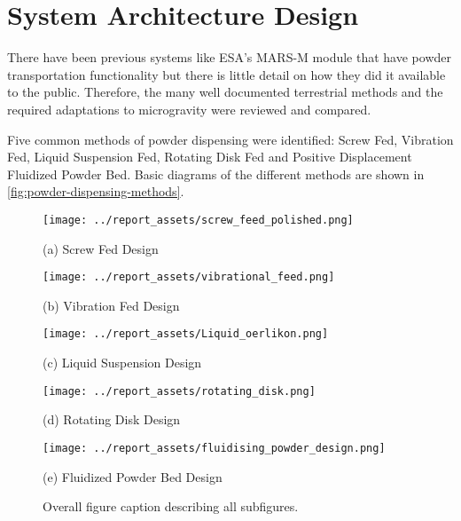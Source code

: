 \section{System Architecture Design}\label{sec:system_architecture}
There have been previous systems like ESA's MARS-M module that have powder transportation functionality but there is little detail on how they did it available to the public. Therefore, the many well documented terrestrial methods and the required adaptations to microgravity were reviewed and compared.

Five common methods of powder dispensing were identified: Screw Fed, Vibration Fed, Liquid Suspension Fed, Rotating Disk Fed and Positive Displacement Fluidized Powder Bed. Basic diagrams of the different methods are shown in \autoref{fig:powder-dispensing-methods}. 
\begin{figure}[htbp]
    \centering

    \begin{minipage}{0.3\textwidth}
        \centering
        \texttt{[image: ../report\_assets/screw\_feed\_polished.png]}
        \caption*{(a) Screw Fed Design~\cite{Bitragunta2015}}
    \end{minipage}
    \hfill
    \begin{minipage}{0.3\textwidth}
        \centering
        \texttt{[image: ../report\_assets/vibrational\_feed.png]}
        \caption*{(b) Vibration Fed Design~\cite{Sinclair2021}}
    \end{minipage}
    \hfill
    \begin{minipage}{0.3\textwidth}
        \centering
        \texttt{[image: ../report\_assets/Liquid\_oerlikon.png]}
        \caption*{(c) Liquid Suspension Design~\cite{OerlikonMetcoFeeders2023}}
    \end{minipage}

    \vspace{0.5cm} %

    \begin{minipage}{0.4\textwidth}
        \centering
        \texttt{[image: ../report\_assets/rotating\_disk.png]}
        \caption*{(d) Rotating Disk Design~\cite{Crawmer2013}}
    \end{minipage}
    \hspace{0.1\textwidth}
    \begin{minipage}{0.4\textwidth}
        \centering
        \texttt{[image: ../report\_assets/fluidising\_powder\_design.png]}
        \caption*{(e) Fluidized Powder Bed Design~\cite{Li2016}}
    \end{minipage}

    \caption{Overall figure caption describing all subfigures.}\label{fig:powder-dispensing-methods}
\end{figure}


